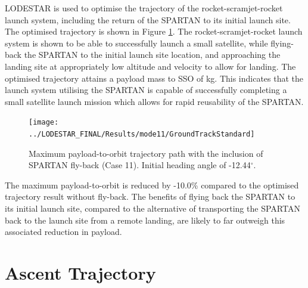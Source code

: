 LODESTAR is used to optimise the trajectory of the rocket-scramjet-rocket launch system, including the return of the SPARTAN to its initial launch site. The optimised trajectory is shown in Figure \ref{fig:GroundTrackStandard}. 
The rocket-scramjet-rocket launch system is shown to be able to successfully launch a small satellite, 
while flying-back the SPARTAN to the initial launch site location, and approaching the landing site at appropriately low altitude and velocity to allow for landing. 
The optimised trajectory attains a payload mass to SSO of \PayloadToOrbitStandard kg. 
This indicates that the launch system utilising the SPARTAN is capable of successfully completing a small satellite launch mission which allows for rapid reusability of the SPARTAN. 
\begin{figure}[ht!]
	\centering
	\texttt{[image: ../LODESTAR\_FINAL/Results/mode11/GroundTrackStandard]}
	\caption{Maximum payload-to-orbit trajectory path with the inclusion of SPARTAN fly-back (Case 11). Initial heading angle of -12.44$^\circ$.}
	\label{fig:GroundTrackStandard}
\end{figure}
The maximum payload-to-orbit is reduced by -10.0\% compared to the optimised trajectory result without fly-back. The benefits of flying back the SPARTAN to its initial launch site, compared to the alternative of transporting the SPARTAN back to the launch site from a remote landing, are likely to far outweigh this associated reduction in payload. 



\section{Ascent Trajectory}

